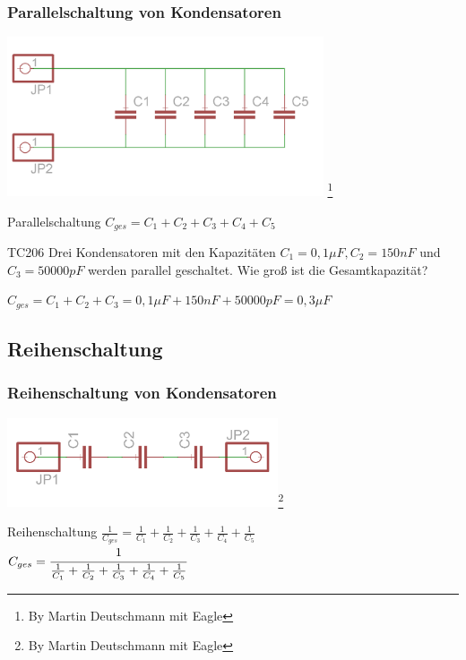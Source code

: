 \begin{frame}
    \frametitle{Parallelschaltung von Kondensatoren}
    \begin{center}
        \includegraphics[width=0.7\textwidth]{e05/c-parallel.png}
        \footnote{\tiny By Martin Deutschmann mit Eagle}
    \end{center}
    \begin{block}{Parallelschaltung}
      $C_{ges} = C_1 + C_2 + C_3 + C_4 + C_5$
    \end{block}
\end{frame}
	
\begin{frame}
  \begin{exampleblock}{TC206}
    Drei Kondensatoren mit den Kapazitäten $C_{1} = 0,1 \mu F, C_{2} = 150 nF$ und $C_{3} = 50000 pF$ werden parallel geschaltet. Wie groß ist die Gesamtkapazität?
  \end{exampleblock}
  \pause
  \begin{center}
    $C_{ges} = C_1 + C_2 + C_3 = 0,1 \mu F + 150 nF + 50000 pF = 0,3 \mu F$
  \end{center}
\end{frame}

\subsection*{Reihen\-schaltung}

\begin{frame}
  \frametitle{Reihenschaltung von Kondensatoren}
  \begin{center}
    \includegraphics[width=0.6\textwidth]{e05/c-reihe.png}\footnote{\tiny By Martin Deutschmann mit Eagle}
  \end{center}
  \begin{block}{Reihenschaltung}
      $\frac{1}{C_{ges}} = \frac{1}{C_1} + \frac{1}{C_2} + \frac{1}{C_3} + \frac{1}{C_4} + \frac{1}{C_5}$\\
      $C_{ges} = \cfrac{1}{\frac{1}{C_1} + \frac{1}{C_2} + \frac{1}{C_3} + \frac{1}{C_4} + \frac{1}{C_5}}$
  \end{block}
\end{frame}
 
